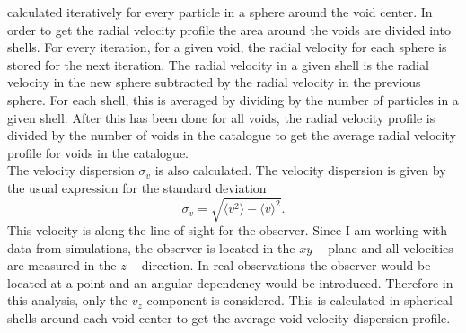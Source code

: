 calculated iteratively for every particle in a sphere around the void center. In
order to get the radial velocity profile the area around the voids are divided into
shells. For every iteration, for a given void, the radial
velocity for each sphere is stored for the next iteration. The radial velocity in a given shell
is the radial velocity in the new sphere subtracted by
the radial velocity in the previous sphere. For each shell, this is averaged by
dividing by the number of particles in a given shell. After this has
been done for all voids, the radial velocity profile is divided by the number of voids in the catalogue to get
the average radial velocity profile for voids in the catalogue.
\\\indent
The velocity dispersion $\sigma_v$ is also calculated. The velocity dispersion
is given by the usual expression for the standard deviation
\begin{equation}\label{eq:sigma_v}
    \sigma_{v} = \sqrt{\langle v^2 \rangle - \langle v\rangle^2}.
\end{equation}
This velocity is along the line of sight for the observer. Since I am working with data from simulations,
the observer is located in the $xy-$plane and all velocities are measured in the $z-$direction. In real observations
the observer would be located at a point and an angular dependency would be introduced.
Therefore in this analysis, only the $v_z$ component
is considered. This is calculated in spherical shells around each void center to
get the average void velocity dispersion profile.
